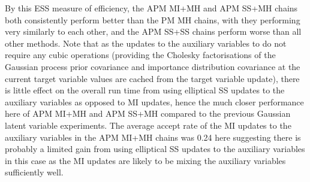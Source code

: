 By this \ac{ESS} measure of efficiency, the \ac{APM} \ac{MI}+\ac{MH} and \ac{APM} \ac{SS}+\ac{MH} chains both consistently perform better than the \ac{PM} \ac{MH} chains, with they performing very similarly to each other, and the \ac{APM} \ac{SS}+\ac{SS} chains perform worse than all other methods. Note that as the updates to the auxiliary variables to do not require any cubic operations (providing the Cholesky factorisations of the Gaussian process prior covariance and importance distribution covariance at the current target variable values are cached from the target variable update), there is little effect on the overall run time from using elliptical \ac{SS} updates to the auxiliary variables as opposed to \ac{MI} updates, hence the much closer performance here of \ac{APM} \ac{MI}+\ac{MH} and \ac{APM} \ac{SS}+\ac{MH} compared to the previous Gaussian latent variable experiments. The average accept rate of the \ac{MI} updates to the auxiliary variables in the \ac{APM} \ac{MI}+\ac{MH} chains was 0.24 here suggesting there is probably a limited gain from using elliptical \ac{SS} updates to the auxiliary variables in this case as the \ac{MI} updates are likely to be mixing the auxiliary variables sufficiently well.%

